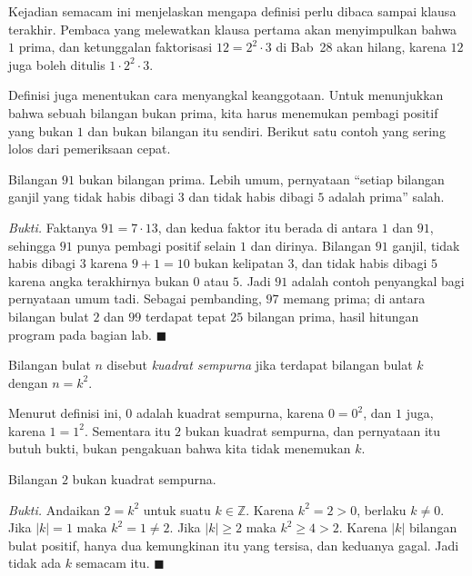 Kejadian semacam ini menjelaskan mengapa definisi perlu dibaca sampai klausa terakhir.
Pembaca yang melewatkan klausa pertama akan menyimpulkan bahwa $1$ prima, dan
ketunggalan faktorisasi $12 = 2^{2}\cdot 3$ di Bab~28 akan hilang, karena $12$ juga
boleh ditulis $1 \cdot 2^{2} \cdot 3$.

Definisi juga menentukan cara menyangkal keanggotaan. Untuk menunjukkan bahwa sebuah
bilangan bukan prima, kita harus menemukan pembagi positif yang bukan $1$ dan bukan
bilangan itu sendiri. Berikut satu contoh yang sering lolos dari pemeriksaan cepat.

\begin{proposisi}
Bilangan $91$ bukan bilangan prima. Lebih umum, pernyataan ``setiap bilangan ganjil
yang tidak habis dibagi $3$ dan tidak habis dibagi $5$ adalah prima'' salah.
\end{proposisi}
\par\smallskip\noindent\textit{Bukti.} Faktanya $91 = 7 \cdot 13$, dan kedua faktor itu
berada di antara $1$ dan $91$, sehingga $91$ punya pembagi positif selain $1$ dan
dirinya. Bilangan $91$ ganjil, tidak habis dibagi $3$ karena $9+1 = 10$ bukan kelipatan
$3$, dan tidak habis dibagi $5$ karena angka terakhirnya bukan $0$ atau $5$. Jadi $91$
adalah contoh penyangkal bagi pernyataan umum tadi. Sebagai pembanding, $97$ memang prima; di antara bilangan bulat $2$ dan $99$ terdapat
tepat $25$ bilangan prima, hasil hitungan program pada bagian lab.
\hfill$\blacksquare${\parfillskip=0pt\par}

\begin{definisi}
Bilangan bulat $n$ disebut \emph{kuadrat sempurna} jika terdapat bilangan bulat $k$
dengan $n = k^{2}$.
\end{definisi}

Menurut definisi ini, $0$ adalah kuadrat sempurna, karena $0 = 0^{2}$, dan $1$ juga,
karena $1 = 1^{2}$. Sementara itu $2$ bukan kuadrat sempurna, dan pernyataan itu butuh
bukti, bukan pengakuan bahwa kita tidak menemukan $k$.

\begin{proposisi}
Bilangan $2$ bukan kuadrat sempurna.
\end{proposisi}
\par\smallskip\noindent\textit{Bukti.} Andaikan $2 = k^{2}$ untuk suatu $k \in
\mathbb{Z}$. Karena $k^{2} = 2 > 0$, berlaku $k \neq 0$. Jika $|k| = 1$ maka
$k^{2} = 1 \neq 2$. Jika $|k| \geq 2$ maka $k^{2} \geq 4 > 2$. Karena $|k|$ bilangan
bulat positif, hanya dua kemungkinan itu yang tersisa, dan keduanya gagal. Jadi tidak
ada $k$ semacam itu.
\hfill$\blacksquare${\parfillskip=0pt\par}

